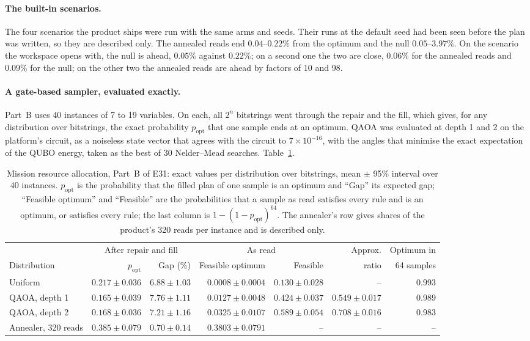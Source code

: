 \documentclass[11pt,a4paper]{article}
\begin{document}
\paragraph{The built-in scenarios.} The four scenarios the product ships
were run with the same arms and seeds. Their runs at the default seed had
been seen before the plan was written, so they are described only. The
annealed reads end $0.04$--$0.22\%$ from the optimum and the null
$0.05$--$3.97\%$. On the scenario the workspace opens with, the null is
ahead, $0.05\%$ against $0.22\%$; on a second one the two are close,
$0.06\%$ for the annealed reads and $0.09\%$ for the null; on the other two
the annealed reads are ahead by factors of 10 and 98.

\paragraph{A gate-based sampler, evaluated exactly.} Part~B uses 40
instances of 7 to 19 variables. On each, all $2^n$ bitstrings went through
the repair and the fill, which gives, for any distribution over bitstrings,
the exact probability $p_{\mathrm{opt}}$ that one sample ends at an optimum.
QAOA was evaluated at depth 1 and 2 on the platform's circuit, as a
noiseless state vector that agrees with the circuit to $7\times10^{-16}$,
with the angles that minimise the exact expectation of the QUBO energy,
taken as the best of 30 Nelder--Mead searches. Table~\ref{tab:mission-b}.

\begin{table}[H]
\centering\footnotesize\setlength{\tabcolsep}{2.5pt}
\begin{tabular}{lrrrrrr}
\toprule
 & \multicolumn{2}{c}{After repair and fill} & \multicolumn{2}{c}{As read} & Approx. & Optimum in \\
Distribution & $p_{\mathrm{opt}}$ & Gap (\%) & Feasible optimum & Feasible & ratio & 64 samples \\
\midrule
Uniform & $0.217 \pm 0.036$ & $6.88 \pm 1.03$ & $0.0008 \pm 0.0004$ & $0.130 \pm 0.028$ & -- & 0.993 \\
QAOA, depth 1 & $0.165 \pm 0.039$ & $7.76 \pm 1.11$ & $0.0127 \pm 0.0048$ & $0.424 \pm 0.037$ & $0.549 \pm 0.017$ & 0.989 \\
QAOA, depth 2 & $0.168 \pm 0.036$ & $7.21 \pm 1.16$ & $0.0325 \pm 0.0107$ & $0.589 \pm 0.054$ & $0.708 \pm 0.016$ & 0.983 \\
Annealer, 320 reads & $0.385 \pm 0.079$ & $0.70 \pm 0.14$ & $0.3803 \pm 0.0791$ & -- & -- & -- \\
\bottomrule
\end{tabular}
\caption{Mission resource allocation, Part~B of E31: exact values per
distribution over bitstrings, mean $\pm$ 95\% interval over 40 instances.
$p_{\mathrm{opt}}$ is the probability that the filled plan of one sample is
an optimum and ``Gap'' its expected gap; ``Feasible optimum'' and
``Feasible'' are the probabilities that a sample as read satisfies every
rule and is an optimum, or satisfies every rule; the last column is
$1-(1-p_{\mathrm{opt}})^{64}$. The annealer's row gives shares of the
product's 320 reads per instance and is described only.}
\label{tab:mission-b}
\end{table}
\end{document}
